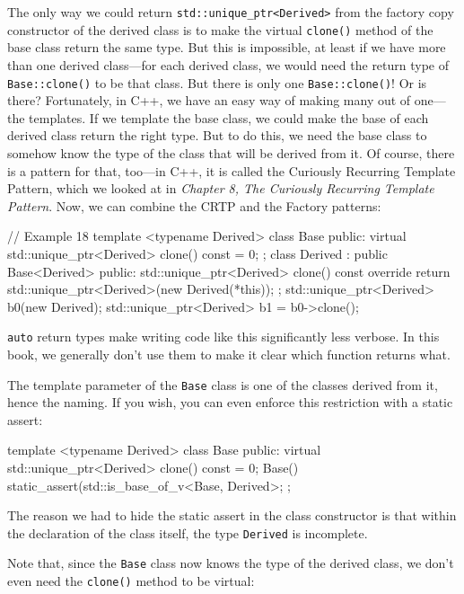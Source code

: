 The only way we could return \texttt{std::unique\_ptr\textless{}Derived\textgreater{}} from the factory copy constructor of the derived class is to make the virtual \texttt{clone()} method of the base class return the same type. But this is impossible, at least if we have more than one derived class---for each derived class, we would need the return type of \texttt{Base::clone()} to be that class. But there is only one \texttt{Base::clone()}! Or is there? Fortunately, in C++, we have an easy way of making many out of one---the templates. If we template the base class, we could make the base of each derived class return the right type. But to do this, we need the base class to somehow know the type of the class that will be derived from it. Of course, there is a pattern for that, too---in C++, it is called the Curiously Recurring Template Pattern, which we looked at in \emph{Chapter 8, The Curiously Recurring Template Pattern}. Now, we can combine the CRTP and the Factory patterns:

\begin{code}
// Example 18
template <typename Derived> class Base {
  public:
  virtual std::unique_ptr<Derived> clone() const = 0;
};
class Derived : public Base<Derived> {
  public:
  std::unique_ptr<Derived> clone() const override {
    return std::unique_ptr<Derived>(new Derived(*this));
  }
};
std::unique_ptr<Derived> b0(new Derived);
std::unique_ptr<Derived> b1 = b0->clone();
\end{code}

\texttt{auto} return types make writing code like this significantly less verbose. In this book, we generally don't use them to make it clear which function returns what.

The template parameter of the \texttt{Base} class is one of the classes derived from it, hence the naming. If you wish, you can even enforce this restriction with a static assert:

\begin{code}
template <typename Derived> class Base {
  public:
  virtual std::unique_ptr<Derived> clone() const = 0;
  Base() {
    static_assert(std::is_base_of_v<Base, Derived>;
  }
};
\end{code}

The reason we had to hide the static assert in the class constructor is that within the declaration of the class itself, the type \texttt{Derived} is incomplete.

Note that, since the \texttt{Base} class now knows the type of the derived class, we don't even need the \texttt{clone()} method to be virtual:

